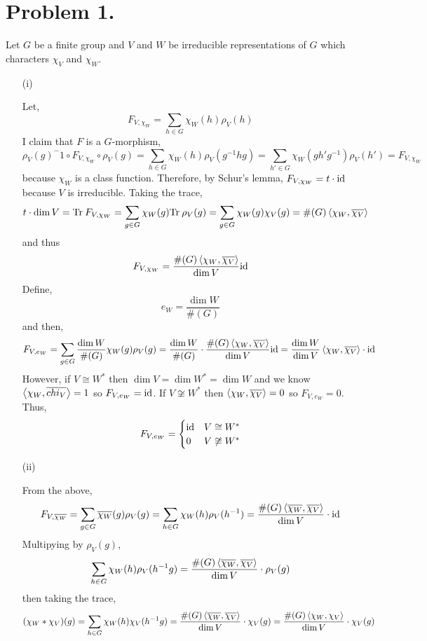 \documentclass[12pt]{extarticle}
\begin{document}

\section*{Problem 1.}

Let $G$ be a finite group and $V$ and $W$ be irreducible representations of $G$ which characters $\chi_V$ and $\chi_W$. 

\begin{enumerate}
\item[(i)]

Let,
\[F_{V,\chi_W} = \sum_{h \in G} \chi_W(h) \rho_V(h)\]
I claim that $F$ is a $G$-morphism,
\[ \rho_V(g)^-1 \circ F_{V,\chi_W} \circ \rho_V(g) = \sum_{h \in G} \chi_W(h) \rho_V(g^{-1}hg) = \sum_{h' \in G} \chi_W(gh'g^{-1}) \rho_V(h') = F_{V, \chi_W} \]
because $\chi_W$ is a class function. Therefore, by Schur's lemma, $F_{V, \chi_W} = t \cdot \mathrm{id}$ because $V$ is irreducible. Taking the trace,
\[ t \cdot \dim{V} = \mathrm{Tr} \: F_{V, \chi_W} = \sum_{g \in G} \chi_W(g) \mathrm{Tr} \: \rho_V(g) = \sum_{g \in G} \chi_W(g) \chi_V(g) = \#(G) \left< \chi_W, \overline{\chi_V} \right> \]
and thus 
\[F_{V, \chi_W} = \frac{\#(G) \left< \chi_W, \overline{\chi_V} \right>}{\dim{V}} \mathrm{id} \]
Define,
\[ e_W = \frac{\dim{W}}{\#(G)} \]
and then,
\[ F_{V, e_W} = \sum_{g \in G} \frac{\dim{W}}{\#(G)} \chi_W(g) \rho_V(g) =  \frac{\dim{W}}{\#(G)} \cdot \frac{\#(G) \left< \chi_W, \overline{\chi_V} \right>}{\dim{V}} \mathrm{id} = \frac{\dim{W}}{\dim{V}} \left< \chi_W, \overline{\chi_V} \right> \cdot \mathrm{id} \] 
However, if $V \cong W^*$ then $\dim{V} = \dim{W^*} = \dim{W}$ and we know $\left< \chi_W, \overline{chi_V} \right> = 1$ so $F_{V, e_W} = \mathrm{id}$. If $V \not\cong W^*$ then $\left< \chi_W, \overline{\chi_V} \right> = 0$ so $F_{V, e_W} = 0$. Thus,
\[ F_{V, e_W} = \begin{cases}
\mathrm{id} & V \cong W^* \\
0 & V \not\cong W^*
\end{cases}\]

\item[(ii)]

From the above,
\[ F_{V, \overline{\chi_W}} = \sum_{g \in G} \overline{\chi_W}(g) \rho_V(g) = \sum_{h \in G} \chi_W(h) \rho_V(h^{-1}) = \frac{\#(G) \left< \overline{\chi_W}, \overline{\chi_V} \right>}{\dim{V}} \cdot \mathrm{id} \]
Multipying by $\rho_V(g)$,
\[
\sum_{h \in G} \chi_W(h) \rho_V(h^{-1}g) = \frac{\#(G) \left< \overline{\chi_W}, \overline{\chi_V} \right>}{\dim{V}} \cdot \rho_V(g) \]
then taking the trace,
\[
(\chi_W * \chi_V)(g) = \sum_{h \in G} \chi_W(h) \chi_V(h^{-1}g) = \frac{\#(G) \left< \overline{\chi_W}, \overline{\chi_V} \right>}{\dim{V}} \cdot \chi_V(g) = \frac{\#(G) \left< \chi_W, \chi_V \right>}{\dim{V}} \cdot \chi_V(g) \]


\end{enumerate}
\end{document}

